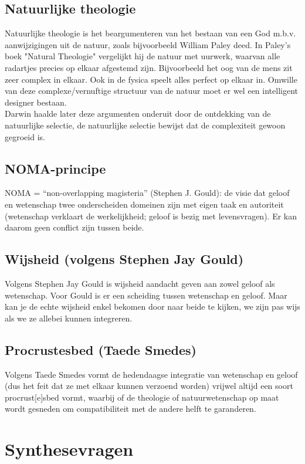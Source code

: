 \documentclass[11pt,a4paper,titlepage]{article}
\begin{document}
\subsection{Natuurlijke theologie }
Natuurlijke theologie is het beargumenteren van het bestaan van een God m.b.v. aanwijzigingen uit de natuur, zoals bijvoorbeeld William Paley deed. In Paley's boek "Natural Theologie" vergelijkt hij de natuur met uurwerk, waarvan alle radartjes precies op elkaar afgestemd zijn. Bijvoorbeeld het oog van de mens zit zeer complex in elkaar.  Ook in de fysica speelt alles perfect op elkaar in. Omwille van deze complexe/vernuftige structuur van de natuur moet er wel een intelligent designer bestaan. \\ Darwin haalde later deze argumenten onderuit door de ontdekking van de natuurlijke selectie, de natuurlijke selectie bewijst dat de complexiteit gewoon gegroeid is.
\subsection{NOMA-principe}
NOMA = “non-overlapping magisteria” (Stephen J. Gould): de visie dat geloof en wetenschap twee onderscheiden domeinen zijn met eigen taak en autoriteit (wetenschap verklaart de werkelijkheid; geloof is bezig met levensvragen). Er kan daarom geen conflict zijn tussen beide.
\subsection{Wijsheid (volgens Stephen Jay Gould)}
Volgens Stephen Jay Gould is wijsheid aandacht geven aan zowel geloof als wetenschap. Voor Gould is er een scheiding tussen wetenschap en geloof. Maar kan je de echte wijsheid enkel bekomen door naar beide te kijken, we zijn pas wijs als we ze allebei kunnen integreren.
\subsection{Procrustesbed (Taede Smedes)}
Volgens Taede Smedes vormt de hedendaagse integratie van wetenschap en geloof (dus het feit dat ze met elkaar kunnen verzoend worden) vrijwel altijd een soort procrust[e]sbed vormt, waarbij of de theologie of natuurwetenschap op maat wordt gesneden om compatibiliteit met de andere helft te garanderen.
\section{Synthesevragen}
\end{document}
